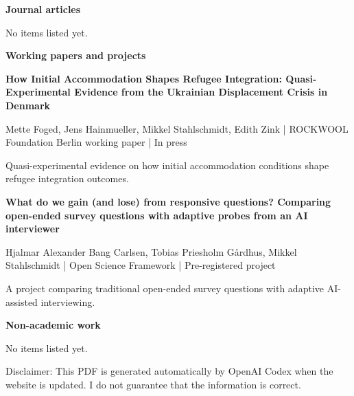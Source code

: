 \documentclass[10pt]{article}
\begin{document}
\vspace{0.9em}
{\sffamily\bfseries\color{accent} Journal articles\par}
\vspace{0.35em}
{\footnotesize No items listed yet.\par}
\vspace{0.55em}
{\sffamily\bfseries\color{accent} Working papers and projects\par}
\vspace{0.35em}
\textbf{How Initial Accommodation Shapes Refugee Integration: Quasi-Experimental Evidence from the Ukrainian Displacement Crisis in Denmark}\par
{\footnotesize Mette Foged, Jens Hainmueller, Mikkel Stahlschmidt, Edith Zink | ROCKWOOL Foundation Berlin working paper | In press}\par
Quasi-experimental evidence on how initial accommodation conditions shape refugee integration outcomes.\par
\vspace{0.6em}
\textbf{What do we gain (and lose) from responsive questions? Comparing open-ended survey questions with adaptive probes from an AI interviewer}\par
{\footnotesize Hjalmar Alexander Bang Carlsen, Tobias Priesholm Gårdhus, Mikkel Stahlschmidt | Open Science Framework | Pre-registered project}\par
A project comparing traditional open-ended survey questions with adaptive AI-assisted interviewing.\par
\vspace{0.6em}
\vspace{0.55em}
{\sffamily\bfseries\color{accent} Non-academic work\par}
\vspace{0.35em}
{\footnotesize No items listed yet.\par}
\vspace{0.55em}

\vfill
{\sffamily\footnotesize\color{black!65} Disclaimer: This PDF is generated automatically by OpenAI Codex when the website is updated. I do not guarantee that the information is correct.\par}
\end{document}
